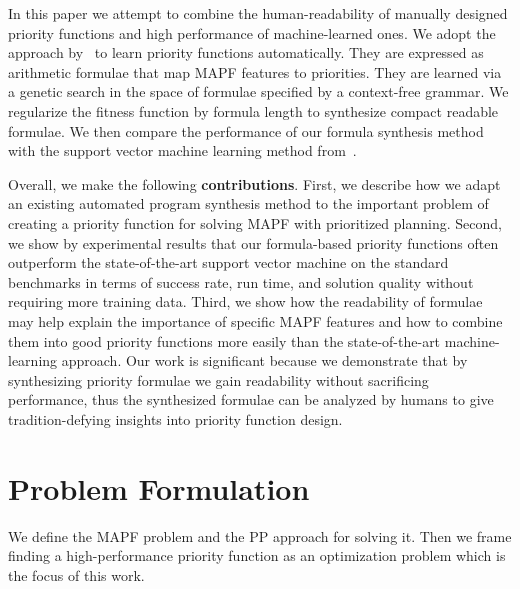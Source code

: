 In this paper we attempt to combine the human-readability of manually designed priority functions and high performance of machine-learned ones. We adopt the approach by~\citet{bulitko2portability} to learn priority functions automatically. They are expressed as arithmetic formulae that map MAPF features to priorities. They are learned via a genetic search in the space of formulae specified by a context-free grammar. We regularize the fitness function by formula length to synthesize compact readable formulae. We then compare the performance of our formula synthesis method with the support vector machine learning method from~\citet{zhang2learning}.

Overall, we make the following \textbf{contributions}. First, we describe how we adapt an existing automated program synthesis method to the important problem of creating a priority function for solving MAPF with prioritized planning. Second, we show by experimental results that our formula-based priority functions often outperform the state-of-the-art support vector machine on the standard benchmarks in terms of success rate, run time, and solution quality without requiring more training data. Third, we show how the readability of formulae may help explain the importance of specific MAPF features and how to combine them into good priority functions more easily than the state-of-the-art machine-learning approach. Our work is significant because we demonstrate that by synthesizing priority formulae we gain readability without sacrificing performance, thus the synthesized formulae can be analyzed by humans to give tradition-defying insights into priority function design.

\section{Problem Formulation}
\label{sec:problemFormulation}

We define the MAPF problem and the PP approach for solving it. Then we frame finding a high-performance priority function as an optimization problem which is the focus of this work.

